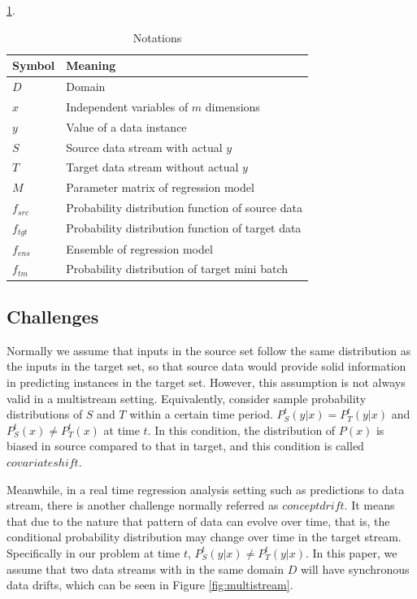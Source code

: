 \ref{tab1}.

\begin{table}[H]
\centering
\caption{Notations}
\label{tab1}
\begin{tabular}{|l|l|}
\hline
 Symbol & Meaning \\ \hline
 $D$ & Domain \\ \hline
 $x$ & Independent variables of $m$ dimensions \\ \hline
 $y$ & Value of a data instance \\ \hline
 $S$ & Source data stream with actual $y$ \\ \hline
 $T$ & Target data stream without actual $y$  \\ \hline
 $M$ & Parameter matrix of regression model  \\ \hline
 $f_{src}$ & Probability distribution function of source data \\ \hline 
 $f_{tgt}$ & Probability distribution function of target data \\ \hline
 $f_{ens}$ & Ensemble of regression model \\ \hline
 $f_{tm}$ & Probability distribution of target mini batch \\ \hline
\end{tabular}
\end{table}



\subsection{Challenges}
\label{challenges}
Normally we assume that inputs in the source set follow the
same distribution as the inputs in the target set, so that
source
data would provide solid information in predicting instances in
the target set. However, this assumption is not always valid in 
a multistream setting. Equivalently, consider sample
probability distributions of $S$ and $T$ within a certain time period.
$P_{S}^{t}(y|x) = P_{T}^{t}(y|x)$ and $P_{S}^{t}(x) \neq P_{T}^{t}
(x)$ at time $t$. In this condition, the distribution of $P(x)$ is biased 
in source compared to that in target, and this condition is called 
$covariate shift$.

Meanwhile, in a real time regression analysis setting such as
predictions to data stream, there is another challenge normally
referred as $concept drift$. It means that due to the nature
that pattern of data can evolve over time, that is, the
conditional probability distribution may change over time in the target stream. Specifically in our problem at time $t$,
$P_{S}^{t}(y|x) \neq P_{T}^{t}(y|x)$. In this paper, we assume
that two data streams with in the same domain $D$ will have
synchronous data drifts, which can be seen in Figure
\ref{fig:multistream}.




